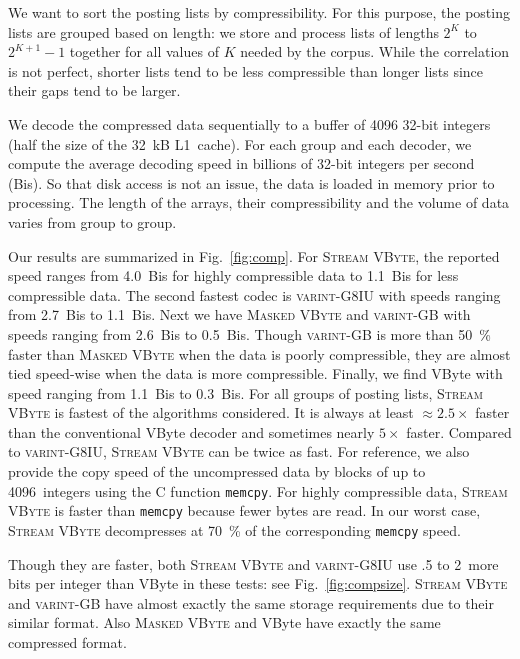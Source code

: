 \documentclass[compress]{elsarticle}
\newcommand{\vbyte}{VByte}
\newcommand{\maskedvbyte}{\textsc{Masked \vbyte{}}}
\newcommand{\varintgb}{\textsc{varint-GB}}
\newcommand{\streamvbyte}{\textsc{Stream \vbyte{}}}
\newcommand{\varintgiu}{\textsc{varint-G8IU}}
\begin{document}
We want to sort the posting lists by compressibility. For this purpose, the posting lists are grouped based on  length:
we store and process lists of lengths  $2^K$ to $2^{K+1}-1$ together for all values of $K$ needed by the corpus.
While the correlation is not perfect, shorter lists tend to be less compressible  than longer lists since their gaps tend to be larger.


We decode the compressed data sequentially to a  buffer of \num{4096} 32-bit integers (half the size of the \SI{32}{kB} L1~cache).
 For each group and each decoder, we compute the average decoding speed in billions of 32-bit integers per second (Bis). So that disk access is not an issue, the data is loaded in memory
prior to processing. The length of the arrays, their compressibility and the volume of data varies from group to group.

 Our results are summarized in Fig.~\ref{fig:comp}. %
 For \streamvbyte{}, the reported speed ranges from \SI{4.0}{Bis} for highly compressible data to \SI{1.1}{Bis} for less compressible data.
 The second fastest codec is \varintgiu{} with speeds ranging from
 \SI{2.7}{Bis} to \SI{1.1}{Bis}.
Next we have \maskedvbyte{} and  \varintgb{} with
speeds  ranging from
 \SI{2.6}{Bis} to \SI{0.5}{Bis}. Though \varintgb{}
 is more than \SI{50}{\percent} faster than \maskedvbyte{} when the data
 is poorly compressible, they are almost tied speed-wise when the data
 is more compressible.
 Finally, we find \vbyte{} with speed
 ranging from
 \SI{1.1}{Bis} to \SI{0.3}{Bis}.
For all groups of posting lists, \streamvbyte{} is fastest of the algorithms considered. It is always
at least $\approx 2.5\times$ faster than the conventional \vbyte{} decoder
 and sometimes nearly $5\times$ faster. Compared to \varintgiu{},
\streamvbyte{} can be twice as fast.
For reference, we also provide  the copy speed of the uncompressed
data by blocks of up to \num{4096}~integers using the C function \texttt{memcpy}.
For highly compressible data,  \streamvbyte{} is
  faster than \texttt{memcpy} because fewer bytes are read. In our worst case, \streamvbyte{} decompresses at \SI{70}{\percent} of the corresponding \texttt{memcpy} speed.


Though they are faster,  both \streamvbyte{} and  \varintgiu{}
use .5 to 2~more bits per integer than \vbyte{} in these tests: see Fig.~\ref{fig:compsize}.
\streamvbyte{}  and \varintgb{} have almost exactly the same
storage requirements due to their similar format.
Also \maskedvbyte{} and \vbyte{} have exactly
the same compressed format.
\end{document}
